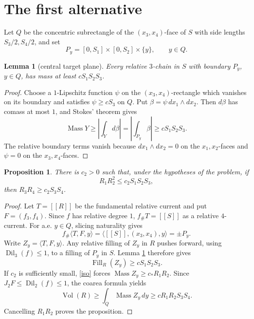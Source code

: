 \documentclass[12pt]{article}
\newtheorem{lemma}{Lemma}
\newtheorem{proposition}{Proposition}
\newcommand{\Dil}{\operatorname{Dil}}
\newcommand{\Vol}{\operatorname{Vol}}
\newcommand{\Mass}{\operatorname{Mass}}
\newcommand{\Fill}{\operatorname{Fill}}
\begin{document}
\section*{The first alternative}

Let \(Q\) be the concentric subrectangle of the \((x_3,x_4)\)-face of \(S\)
with side lengths \(S_3/2,S_4/2\), and set
\[
        P_y=[0,S_1]\times[0,S_2]\times\{y\},\qquad y\in Q.
\]

\begin{lemma}[central target plane]\label{central}
Every relative \(3\)-chain in \(S\) with boundary \(P_y\), \(y\in Q\), has
mass at least \(cS_1S_2S_3\).
\end{lemma}

\begin{proof}
Choose a \(1\)-Lipschitz function \(\psi\) on the
\((x_3,x_4)\)-rectangle which vanishes on its boundary and satisfies
\(\psi\ge cS_3\) on \(Q\).  Put \(\beta=\psi\,dx_1\wedge dx_2\).  Then
\(d\beta\) has comass at most \(1\), and Stokes' theorem gives
\[
\Mass Y\ge\left|\int_Yd\beta\right|
 =\left|\int_{P_y}\beta\right|\ge cS_1S_2S_3 .
\]
The relative boundary terms vanish because \(dx_1\wedge dx_2=0\) on the
\(x_1,x_2\)-faces and \(\psi=0\) on the \(x_3,x_4\)-faces.
\end{proof}

\begin{proposition}\label{firstalt}
There is \(c_2>0\) such that, under the hypotheses of the problem, if
\[
        R_1R_2^2\le c_2S_1S_2S_3 ,
\]
then \(R_3R_4\ge c_2S_3S_4\).
\end{proposition}

\begin{proof}
Let \(T=[[R]]\) be the fundamental relative current and put \(F=(f_3,f_4)\).
Since \(f\) has relative degree \(1\), \(f_\#T=[[S]]\) as a relative
\(4\)-current.  For a.e. \(y\in Q\), slicing naturality gives
\[
        f_\#\langle T,F,y\rangle
        =\langle [[S]],(x_3,x_4),y\rangle=\pm P_y .
\]
Write \(Z_y=\langle T,F,y\rangle\).  Any relative filling of \(Z_y\) in \(R\)
pushes forward, using \(\Dil_3(f)\le1\), to a filling of \(P_y\) in \(S\).
Lemma \ref{central} therefore gives
\[
        \Fill_R(Z_y)\ge cS_1S_2S_3 .
\]
If \(c_2\) is sufficiently small, \eqref{iso} forces
\(\Mass Z_y\ge c_*R_1R_2\).  Since \(J_2F\le\Dil_2(f)\le1\), the coarea
formula yields
\[
 \Vol(R)\ge\int_Q\Mass Z_y\,dy
        \ge cR_1R_2S_3S_4 .
\]
Cancelling \(R_1R_2\) proves the proposition.
\end{proof}
\end{document}
